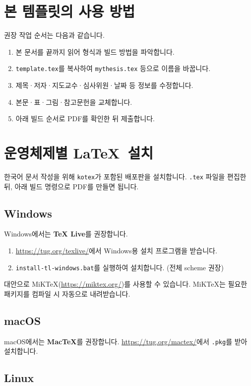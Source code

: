 \documentclass[korean]{aisw}
\begin{document}
\section{본 템플릿의 사용 방법}

권장 작업 순서는 다음과 같습니다.
\begin{enumerate}
    \item 본 문서를 끝까지 읽어 형식과 빌드 방법을 파악합니다.
    \item \texttt{template.tex}를 복사하여 \texttt{mythesis.tex} 등으로 이름을 바꿉니다.
    \item 제목·저자·지도교수·심사위원·날짜 등 정보를 수정합니다.
    \item 본문·표·그림·참고문헌을 교체합니다.
    \item 아래 빌드 순서로 PDF를 확인한 뒤 제출합니다.
\end{enumerate}

\section{운영체제별 \LaTeX\ 설치}

한국어 문서 작성을 위해 \texttt{kotex}가 포함된 배포판을 설치합니다.
\texttt{.tex} 파일을 편집한 뒤, 아래 빌드 명령으로 PDF를 만들면 됩니다.

\subsection{Windows}

Windows에서는 \textbf{TeX Live}를 권장합니다.
\begin{enumerate}
    \item \url{https://tug.org/texlive/}에서 Windows용 설치 프로그램을 받습니다.
    \item \texttt{install-tl-windows.bat}를 실행하여 설치합니다. (전체 scheme 권장)
\end{enumerate}
대안으로 MiKTeX(\url{https://miktex.org/})를 사용할 수 있습니다.
MiKTeX는 필요한 패키지를 컴파일 시 자동으로 내려받습니다.

\subsection{macOS}

macOS에서는 \textbf{MacTeX}를 권장합니다.
\url{https://tug.org/mactex/}에서 \texttt{.pkg}를 받아 설치합니다.

\subsection{Linux}
\end{document}
